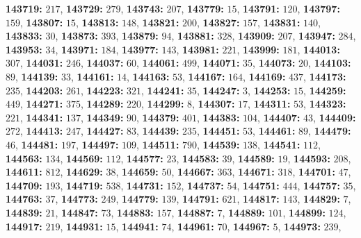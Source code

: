 \textsf{\bfseries 143719:} $217$, \textsf{\bfseries 143729:} $279$, \textsf{\bfseries 143743:} $207$, \textsf{\bfseries 143779:} $15$, \textsf{\bfseries 143791:} $120$, \textsf{\bfseries 143797:} $159$, \textsf{\bfseries 143807:} $15$, \textsf{\bfseries 143813:} $148$, \textsf{\bfseries 143821:} $200$, \textsf{\bfseries 143827:} $157$, \textsf{\bfseries 143831:} $140$, \textsf{\bfseries 143833:} $30$, \textsf{\bfseries 143873:} $393$, \textsf{\bfseries 143879:} $94$, \textsf{\bfseries 143881:} $328$, \textsf{\bfseries 143909:} $207$, \textsf{\bfseries 143947:} $284$, \textsf{\bfseries 143953:} $34$, \textsf{\bfseries 143971:} $184$, \textsf{\bfseries 143977:} $143$, \textsf{\bfseries 143981:} $221$, \textsf{\bfseries 143999:} $181$, \textsf{\bfseries 144013:} $307$, \textsf{\bfseries 144031:} $246$, \textsf{\bfseries 144037:} $60$, \textsf{\bfseries 144061:} $499$, \textsf{\bfseries 144071:} $35$, \textsf{\bfseries 144073:} $20$, \textsf{\bfseries 144103:} $89$, \textsf{\bfseries 144139:} $33$, \textsf{\bfseries 144161:} $14$, \textsf{\bfseries 144163:} $53$, \textsf{\bfseries 144167:} $164$, \textsf{\bfseries 144169:} $437$, \textsf{\bfseries 144173:} $235$, \textsf{\bfseries 144203:} $261$, \textsf{\bfseries 144223:} $321$, \textsf{\bfseries 144241:} $35$, \textsf{\bfseries 144247:} $3$, \textsf{\bfseries 144253:} $15$, \textsf{\bfseries 144259:} $449$, \textsf{\bfseries 144271:} $375$, \textsf{\bfseries 144289:} $220$, \textsf{\bfseries 144299:} $8$, \textsf{\bfseries 144307:} $17$, \textsf{\bfseries 144311:} $53$, \textsf{\bfseries 144323:} $221$, \textsf{\bfseries 144341:} $137$, \textsf{\bfseries 144349:} $90$, \textsf{\bfseries 144379:} $401$, \textsf{\bfseries 144383:} $104$, \textsf{\bfseries 144407:} $43$, \textsf{\bfseries 144409:} $272$, \textsf{\bfseries 144413:} $247$, \textsf{\bfseries 144427:} $83$, \textsf{\bfseries 144439:} $235$, \textsf{\bfseries 144451:} $53$, \textsf{\bfseries 144461:} $89$, \textsf{\bfseries 144479:} $46$, \textsf{\bfseries 144481:} $197$, \textsf{\bfseries 144497:} $109$, \textsf{\bfseries 144511:} $790$, \textsf{\bfseries 144539:} $138$, \textsf{\bfseries 144541:} $112$, \textsf{\bfseries 144563:} $134$, \textsf{\bfseries 144569:} $112$, \textsf{\bfseries 144577:} $23$, \textsf{\bfseries 144583:} $39$, \textsf{\bfseries 144589:} $19$, \textsf{\bfseries 144593:} $208$, \textsf{\bfseries 144611:} $812$, \textsf{\bfseries 144629:} $38$, \textsf{\bfseries 144659:} $50$, \textsf{\bfseries 144667:} $363$, \textsf{\bfseries 144671:} $318$, \textsf{\bfseries 144701:} $47$, \textsf{\bfseries 144709:} $193$, \textsf{\bfseries 144719:} $538$, \textsf{\bfseries 144731:} $152$, \textsf{\bfseries 144737:} $54$, \textsf{\bfseries 144751:} $444$, \textsf{\bfseries 144757:} $35$, \textsf{\bfseries 144763:} $37$, \textsf{\bfseries 144773:} $249$, \textsf{\bfseries 144779:} $139$, \textsf{\bfseries 144791:} $621$, \textsf{\bfseries 144817:} $143$, \textsf{\bfseries 144829:} $7$, \textsf{\bfseries 144839:} $21$, \textsf{\bfseries 144847:} $73$, \textsf{\bfseries 144883:} $157$, \textsf{\bfseries 144887:} $7$, \textsf{\bfseries 144889:} $101$, \textsf{\bfseries 144899:} $124$, \textsf{\bfseries 144917:} $219$, \textsf{\bfseries 144931:} $15$, \textsf{\bfseries 144941:} $74$, \textsf{\bfseries 144961:} $70$, \textsf{\bfseries 144967:} $5$, \textsf{\bfseries 144973:} $239$, 
